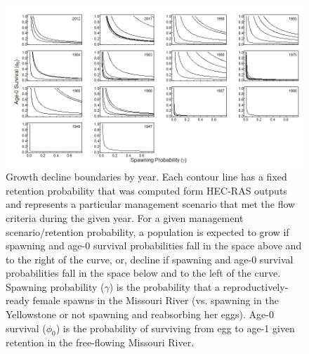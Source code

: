 \documentclass[12pt]{article}
\begin{document}
\begin{figure}[h]
\centering
\hspace*{-0.5in}\includegraphics[width=7.5in]{NEPA_Fig_11-boundaries-alternatives-within-year}
\caption{Growth decline boundaries by year.  Each contour line has a fixed retention probability that was computed form HEC-RAS outputs and represents a particular management scenario that met the flow criteria during the given year.   For a given management scenario/retention probability, a population is expected to grow if spawning and age-0 survival probabilities fall in the space above and to the right of the curve, or, decline if spawning and age-0 survival probabilities fall in the space below and to the left of the curve. Spawning probability ($\gamma$) is the probability that a reproductively-ready female spawns in the Missouri River (vs. spawning in the Yellowstone or not spawning and reabsorbing her eggs).  Age-0 survival ($\phi_0$) is the probability of surviving from egg to age-1 given retention in the free-flowing Missouri River. }
\label{AwiY}
\end{figure}
\end{document}
